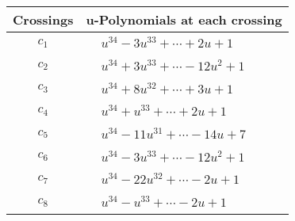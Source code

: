 \documentclass[1p]{elsarticle_modified}
\theoremstyle{definition}
\begin{document}
\begin{tabular}{m{50pt}|m{274pt}}
Crossings & \hspace{64pt}u-Polynomials at each crossing \\
\hline $$\begin{aligned}c_{1}\end{aligned}$$&$\begin{aligned}
&u^{34}-3 u^{33}+\cdots+2 u+1
\end{aligned}$\\
\hline $$\begin{aligned}c_{2}\end{aligned}$$&$\begin{aligned}
&u^{34}+3 u^{33}+\cdots-12 u^2+1
\end{aligned}$\\
\hline $$\begin{aligned}c_{3}\end{aligned}$$&$\begin{aligned}
&u^{34}+8 u^{32}+\cdots+3 u+1
\end{aligned}$\\
\hline $$\begin{aligned}c_{4}\end{aligned}$$&$\begin{aligned}
&u^{34}+u^{33}+\cdots+2 u+1
\end{aligned}$\\
\hline $$\begin{aligned}c_{5}\end{aligned}$$&$\begin{aligned}
&u^{34}-11 u^{31}+\cdots-14 u+7
\end{aligned}$\\
\hline $$\begin{aligned}c_{6}\end{aligned}$$&$\begin{aligned}
&u^{34}-3 u^{33}+\cdots-12 u^2+1
\end{aligned}$\\
\hline $$\begin{aligned}c_{7}\end{aligned}$$&$\begin{aligned}
&u^{34}-22 u^{32}+\cdots-2 u+1
\end{aligned}$\\
\hline $$\begin{aligned}c_{8}\end{aligned}$$&$\begin{aligned}
&u^{34}- u^{33}+\cdots-2 u+1
\end{aligned}$\\

\end{tabular}
\end{document}
